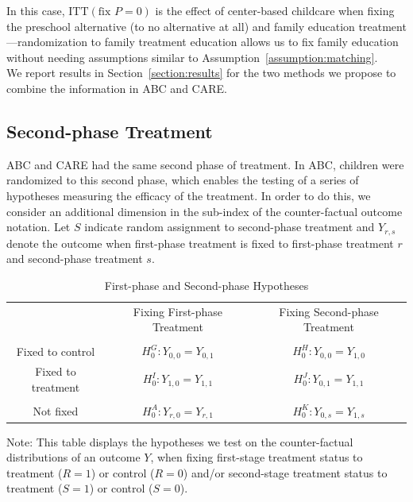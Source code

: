 \noindent In this case, $\text{ITT} \left( \text{fix } P = 0\right)$ is the effect of center-based childcare when fixing the preschool alternative (to no alternative at all) and family education treatment---randomization to family treatment education allows us to fix family education without needing assumptions similar to Assumption~\ref{assumption:matching}.\\

\noindent We report results in Section~\ref{section:results} for the two methods we propose to combine the information in ABC and CARE.

\subsection{Second-phase Treatment}

\noindent ABC and CARE had the same second phase of treatment. In ABC, children were randomized to this second phase, which enables the testing of a series of hypotheses measuring the efficacy of the treatment. 
In order to do this, we consider an additional dimension in the sub-index of the counter-factual outcome notation. Let $S$ indicate random assignment to second-phase treatment and $Y_{r,s}$ denote the outcome when first-phase treatment is fixed to first-phase treatment $r$ and second-phase treatment $s$.\\

\begin{table}[H] 
\begin{threeparttable}
\caption{First-phase and Second-phase Hypotheses}
\label{table:hypotheses}
\centering 
\begin{tabular}{ccc} \hline \hline
 & Fixing First-phase Treatment & Fixing Second-phase Treatment \\ \\ \hline
Fixed to control       & $H_{0}^G: Y_{0,0} = Y_{0,1}$ & $H_{0}^H: Y_{0,0} = Y_{1,0}$ \\
Fixed to treatment  & $H_{0}^I: Y_{1,0} = Y_{1,1}$ & $H_{0}^J: Y_{0,1} = Y_{1,1}$ \\ \\ \hline
Not fixed                 & $H_{0}^A: Y_{r,0} = Y_{r,1}$ & $H_{0}^K: Y_{0,s} = Y_{1,s}$ \\  \hline \hline
\end{tabular}
\begin{tablenotes}
\footnotesize
\item Note: This table displays the hypotheses we test on the counter-factual distributions of an outcome $Y$, when fixing first-stage treatment status to treatment ($R = 1$) or control ($R = 0$) and/or second-stage treatment status to treatment ($S = 1$) or control ($S = 0$).
\end{tablenotes}
\end{threeparttable}
\end{table}

